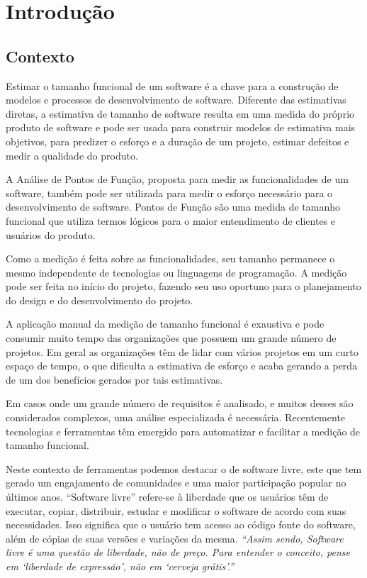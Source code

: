 \chapter[Introdução]{Introdução}

\section{Contexto}

Estimar o tamanho funcional de um software é a chave para a construção de modelos e processos de desenvolvimento de software. Diferente das estimativas diretas, a estimativa de tamanho de software resulta em uma medida do próprio produto de software e pode ser usada para construir modelos de estimativa mais objetivos, para predizer o esforço e a duração de um projeto, estimar defeitos e medir a qualidade do produto. \cite{Ebert:2014}

A Análise de Pontos de Função, proposta para medir as funcionalidades de um software, também pode ser utilizada para medir o esforço necessário para o desenvolvimento de software. Pontos de Função são uma medida de tamanho funcional que utiliza termos lógicos para o maior entendimento de clientes e usuários do produto. \cite{Albrecht:1994}

Como a medição é feita sobre as funcionalidades, seu tamanho permanece o mesmo independente de tecnologias ou linguagens de programação. A medição pode ser feita no início do projeto, fazendo seu uso oportuno para o planejamento do design e do desenvolvimento do projeto. \cite{Kusumoto:2002}

A aplicação manual da medição de tamanho funcional é exaustiva e pode consumir muito tempo das organizações que possuem um grande número de projetos. Em geral as organizações têm de lidar com vários projetos em um curto espaço de tempo, o que dificulta a estimativa de esforço e acaba gerando a perda de um dos benefícios gerados por tais estimativas. \cite{Ebert:2014}

Em casos onde um grande número de requisitos é analisado, e muitos desses são considerados complexos, uma análise especializada é necessária. Recentemente tecnologias e ferramentas têm emergido para automatizar e facilitar a medição de tamanho funcional. \cite{Ebert:2014}

Neste contexto de ferramentas podemos destacar o de software livre, este que tem gerado um engajamento de comunidades e uma maior participação popular no últimos anos. \cite{Eilola:2002} \nocite{Anota:2016} ``Software livre''  refere-se à liberdade que os usuários têm de executar, copiar, distribuir, estudar e modificar o software de acordo com suas necessidades. Isso significa que o usuário tem acesso ao código fonte do software, além de cópias de suas versões e variações da mesma. \cite{Stallman:2003}{\textit{``Assim sendo, Software livre é uma questão de liberdade, não de preço. Para entender o conceito, pense em `liberdade de expressão', não em `cerveja grátis'.''}} \cite{Stallman:2003}

